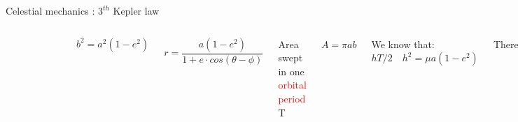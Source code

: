 \documentclass{beamer}
\begin{document}
\begin{frame}{Celestial mechanics \cite{murray1999solar}: $3^{th}$ Kepler law}
\begin{columns}

\begin{figure}[h]
\begin{center}
\includegraphics[width=\textwidth ]{Pic/Elliptical_orbit.png}
\caption{\cite{murray1999solar}}
\label{Area_dynamics}
\end{center}
\end{figure}


\begin{equation}
b^{2}=a^{2}(1-e^{2})
\end{equation}


\begin{equation}
r=\frac{a(1-e^{2})}{1+e\cdot cos(\theta-\phi)}
\label{eq-mot}
\end{equation}

\begin{center}
Area swept in one \textcolor{red}{orbital period} T 
\end{center} 
\begin{center}
$A=\pi ab$
\end{center} 
\begin{center}
We know that: $hT/2 \quad h^{2}=\mu a(1-e^{2})$ 
\end{center}
\begin{center}
Therefore 
\end{center}
\begin{equation}
T^{2}=\dfrac{4\pi^{2}}{\mu}a^{3}
\end{equation}

\end{columns}
\end{frame}
\end{document}
